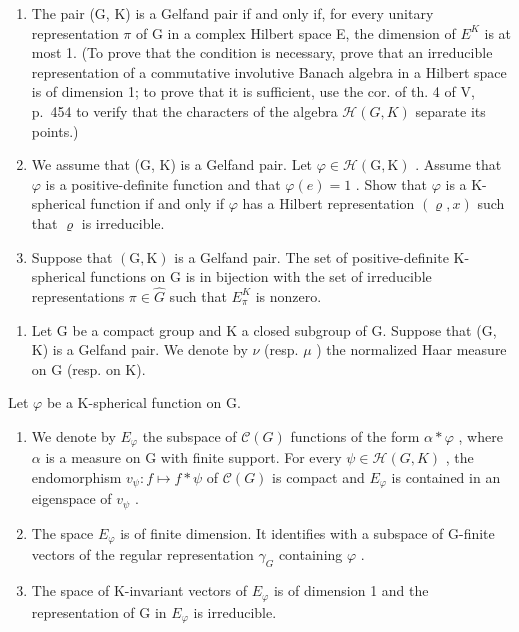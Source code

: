 \begin{enumerate}
\def\labelenumi{\alph{enumi})}
\item
  The pair (G, K) is a Gelfand pair if and only if, for every unitary representation \(\pi\) of G in a complex Hilbert space E, the dimension of \(E^{K}\) is at most 1. (To prove that the condition is necessary, prove that an irreducible representation of a commutative involutive Banach algebra in a Hilbert space is of dimension 1; to prove that it is sufficient, use the cor. of th. 4 of V, p.~454 to verify that the characters of the algebra \(\mathcal{H}(G,K)\) separate its points.)
\item
  We assume that (G, K) is a Gelfand pair. Let \(\varphi \in \mathcal{H}(\mathrm{G},\mathrm{K})\) . Assume that \(\varphi\) is a positive-definite function and that \(\varphi(e) = 1\) . Show that \(\varphi\) is a K-spherical function if and only if \(\varphi\) has a Hilbert representation \((\varrho, x)\) such that \(\varrho\) is irreducible.
\item
  Suppose that \((\mathrm{G},\mathrm{K})\) is a Gelfand pair. The set of positive-definite K-spherical functions on G is in bijection with the set of irreducible representations \(\pi\in\widehat{G}\) such that \(E_{\pi}^{K}\) is nonzero.
\end{enumerate}

\begin{enumerate}
\def\labelenumi{\arabic{enumi})}
\setcounter{enumi}{28}
\tightlist
\item
  Let G be a compact group and K a closed subgroup of G. Suppose that (G, K) is a Gelfand pair. We denote by \(\nu\) (resp. \(\mu\) ) the normalized Haar measure on G (resp. on K).
\end{enumerate}

Let \(\varphi\) be a K-spherical function on G.

\begin{enumerate}
\def\labelenumi{\alph{enumi})}
\item
  We denote by \(E_{\varphi}\) the subspace of \(\mathcal{C}(G)\) functions of the form \(\alpha * \varphi\) , where \(\alpha\) is a measure on G with finite support. For every \(\psi \in \mathcal{H}(G, K)\) , the endomorphism \(v_{\psi}: f \mapsto f * \psi\) of \(\mathcal{C}(G)\) is compact and \(E_{\varphi}\) is contained in an eigenspace of \(v_{\psi}\) .
\item
  The space \(E_{\varphi}\) is of finite dimension. It identifies with a subspace of G-finite vectors of the regular representation \(\gamma_{G}\) containing \(\varphi\) .
\item
  The space of K-invariant vectors of \(E_{\varphi}\) is of dimension 1 and the representation of G in \(E_{\varphi}\) is irreducible.
\end{enumerate}

